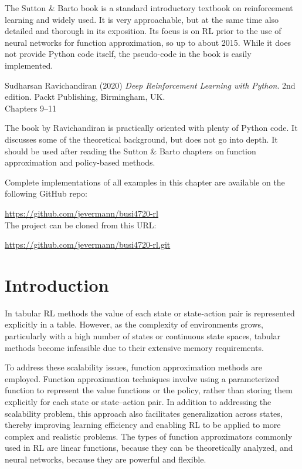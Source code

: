 The Sutton \& Barto book is a standard introductory textbook on reinforcement learning and widely used. It is very approachable, but at the same time also detailed and thorough in its exposition. Its focus is on RL prior to the use of neural networks for function approximation, so up to about 2015. While it does not provide Python code itself, the pseudo-code in the book is easily implemented.


\begin{resourcebox}
Sudharsan Ravichandiran (2020) \emph{Deep Reinforcement Learning with Python}. 2nd edition. Packt Publishing, Birmingham, UK. \\
\vspace{0.5\baselineskip}
Chapters 9--11
\end{resourcebox}

The book by Ravichandiran is practically oriented with plenty of Python code. It discusses some of the theoretical background, but does not go into depth. It should be used after reading the Sutton \& Barto chapters on function approximation and policy-based methods.

\begin{withcode}
\begin{resourcebox}
Complete implementations of all examples in this chapter are available on the following GitHub repo:

\small\url{https://github.com/jevermann/busi4720-rl}\normalsize \\

The project can be cloned from this URL:

\small\url{https://github.com/jevermann/busi4720-rl.git}\normalsize
\end{resourcebox}
\end{withcode}

\section{Introduction}

In tabular RL methods the value of each state or state-action pair is represented explicitly in a table. However, as the complexity of environments grows, particularly with a high number of states or continuous state spaces, tabular methods become infeasible due to their extensive memory requirements. 

To address these scalability issues, function approximation methods are employed. Function approximation techniques involve using a parameterized function to represent the value functions or the policy, rather than storing them explicitly for each state or state--action pair. In addition to addressing the scalability problem, this approach also facilitates generalization across states, thereby improving learning efficiency and enabling RL to be applied to more complex and realistic problems. The types of function approximators commonly used in RL are linear functions, because they can be theoretically analyzed, and neural networks, because they are powerful and flexible. 

